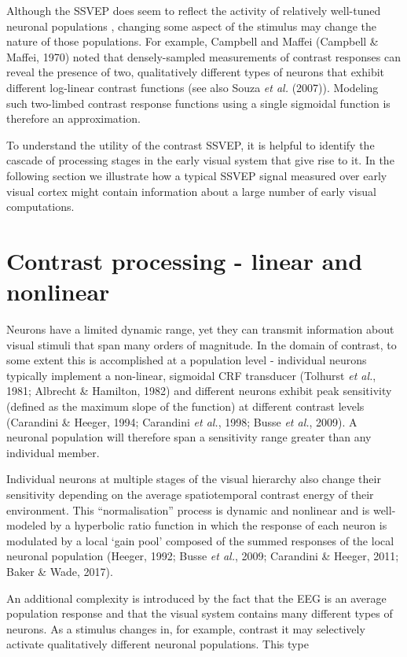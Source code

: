 \documentclass[
  letterpaper,
  DIV=11,
  numbers=noendperiod]{scrartcl}
\begin{document}
Although the SSVEP does seem to reflect the activity of relatively
well-tuned neuronal populations , changing some aspect of the stimulus
may change the nature of those populations. For example, Campbell and
Maffei (Campbell \& Maffei, 1970) noted that densely-sampled
measurements of contrast responses can reveal the presence of two,
qualitatively different types of neurons that exhibit different
log-linear contrast functions (see also Souza \emph{et al.} (2007)).
Modeling such two-limbed contrast response functions using a single
sigmoidal function is therefore an approximation.

To understand the utility of the contrast SSVEP, it is helpful to
identify the cascade of processing stages in the early visual system
that give rise to it. In the following section we illustrate how a
typical SSVEP signal measured over early visual cortex might contain
information about a large number of early visual computations.

\section{Contrast processing - linear and
nonlinear}\label{contrast-processing---linear-and-nonlinear}

Neurons have a limited dynamic range, yet they can transmit information
about visual stimuli that span many orders of magnitude. In the domain
of contrast, to some extent this is accomplished at a population level -
individual neurons typically implement a non-linear, sigmoidal CRF
transducer (Tolhurst \emph{et al.}, 1981; Albrecht \& Hamilton, 1982)
and different neurons exhibit peak sensitivity (defined as the maximum
slope of the function) at different contrast levels (Carandini \&
Heeger, 1994; Carandini \emph{et al.}, 1998; Busse \emph{et al.}, 2009).
A neuronal population will therefore span a sensitivity range greater
than any individual member.

Individual neurons at multiple stages of the visual hierarchy also
change their sensitivity depending on the average spatiotemporal
contrast energy of their environment. This ``normalisation'' process is
dynamic and nonlinear and is well-modeled by a hyperbolic ratio function
in which the response of each neuron is modulated by a local `gain pool'
composed of the summed responses of the local neuronal population
(Heeger, 1992; Busse \emph{et al.}, 2009; Carandini \& Heeger, 2011;
Baker \& Wade, 2017).

An additional complexity is introduced by the fact that the EEG is an
average population response and that the visual system contains many
different types of neurons. As a stimulus changes in, for example,
contrast it may selectively activate qualitatively different neuronal
populations. This type
\end{document}
